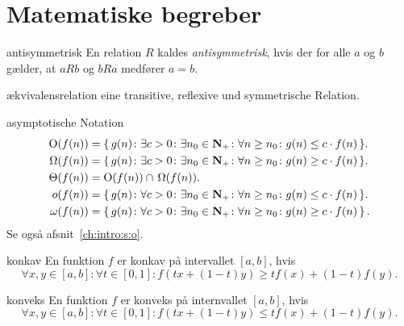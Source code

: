 \section{Matematiske begreber}\label{mathconcepts}

\newcommand{\Oh}[1]{\operatorname{O}(#1)}
\newcommand{\Om}[1]{\Omega(#1)}
\newcommand{\Th}[1]{\Theta(#1)}

\renewcommand*\mydescriptionlabel[1]{{\bf #1}:}
\begin{mydescription}

  \item[antisymmetrisk]
    En relation $R$ kaldes \emph{antisymmetrisk}, hvis der for alle $a$ og $b$  gælder, at $aRb$ og $bRa$ medfører $a = b$. 

  \item[ækvivalensrelation]
    eine transitive, reflexive und
    symmetrische Relation. 

  \item[asymptotische Notation] 
    \begin{align*}
      \Oh{f(n)} &=  \{\,g(n)\colon\exists c>0\colon\exists n_0\in\NN_+\colon\forall n\geq n_0\colon g(n)\leq c\cdot f(n)\,\}.\\
      \Om{f(n)} &=  \{\,g(n)\colon\exists c>0\colon\exists n_0\in\NN_+\colon\forall n\geq n_0\colon g(n)\geq c\cdot f(n)\,\}.\\
      \Th{f(n)} &=  \Oh{f(n)}\cap\,\Om{f(n)}.\\
      o(f(n)) &=  \{\,g(n)\colon\forall c>0\colon\exists n_0\in\NN_+\colon\forall n\geq n_0\colon g(n)\leq c\cdot f(n)\,\}.\\
      \omega(f(n))  &=  \{\,g(n)\colon\forall c>0\colon\exists
    n_0\in\NN_+\colon\forall n\geq n_0\colon g(n)\geq c\cdot f(n)\,\}\,.\end{align*}
    Se også afsnit~\ref{ch:intro:s:o}.

  \item[konkav] 
    En funktion $f$ er konkav på intervallet $[a,b]$, hvis
    \[\forall x,y\in[a,b]\colon\forall t\in[0,1]\colon f(tx+(1-t)y)\geq tf(x)+(1-t)f(y).\]

  \item[konveks]
    En funktion  $f$ er konveks på internvallet $[a,b]$, hvis
    \[\forall x,y\in[a,b]\colon\forall t\in[0,1]\colon f(tx+(1-t)y)\le tf(x)+(1-t)f(y).\]


\end{mydescription}
